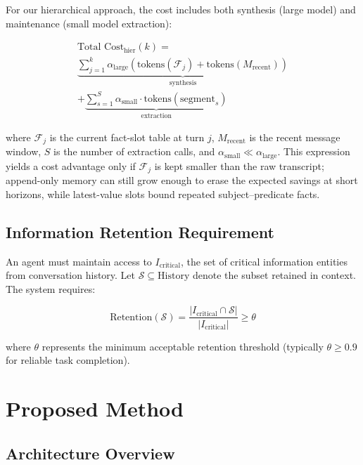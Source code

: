 \documentclass[conference]{IEEEtran}
\begin{document}
For our hierarchical approach, the cost includes both synthesis (large model) and maintenance (small model extraction):

\begin{multline}
\text{Total Cost}_{\text{hier}}(k) = \\
\underbrace{\textstyle\sum_{j=1}^{k} \alpha_{\text{large}} (\text{tokens}(\mathcal{F}_j) + \text{tokens}(M_{\text{recent}}))}_{\text{synthesis}} \\
+ \underbrace{\textstyle\sum_{s=1}^{S} \alpha_{\text{small}} \cdot \text{tokens}(\text{segment}_s)}_{\text{extraction}}
\end{multline}

where $\mathcal{F}_j$ is the current fact-slot table at turn $j$, $M_{\text{recent}}$ is the recent message window, $S$ is the number of extraction calls, and $\alpha_{\text{small}} \ll \alpha_{\text{large}}$. This expression yields a cost advantage only if $\mathcal{F}_j$ is kept smaller than the raw transcript; append-only memory can still grow enough to erase the expected savings at short horizons, while latest-value slots bound repeated subject--predicate facts.

\subsection{Information Retention Requirement}

An agent must maintain access to $I_{\text{critical}}$, the set of critical information entities from conversation history. Let $\mathcal{S} \subseteq \text{History}$ denote the subset retained in context. The system requires:

\begin{equation}
\text{Retention}(\mathcal{S}) = \frac{|I_{\text{critical}} \cap \mathcal{S}|}{|I_{\text{critical}}|} \geq \theta
\end{equation}

where $\theta$ represents the minimum acceptable retention threshold (typically $\theta \geq 0.9$ for reliable task completion).

\section{Proposed Method}
\label{sec:method}

\subsection{Architecture Overview}
\end{document}
